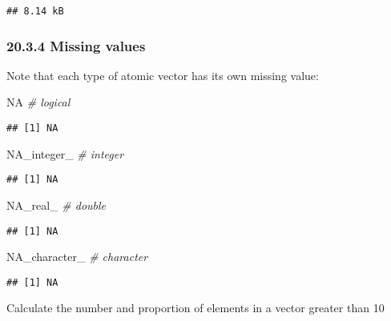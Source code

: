 \documentclass[
]{article}
\newenvironment{Shaded}{\begin{snugshade}}{\end{snugshade}}
\newcommand{\CommentTok}[1]{\textcolor[rgb]{0.56,0.35,0.01}{\textit{#1}}}
\newcommand{\ConstantTok}[1]{\textcolor[rgb]{0.56,0.35,0.01}{#1}}
\begin{document}
\begin{verbatim}
## 8.14 kB
\end{verbatim}

\hypertarget{missing-values-1}{%
\subsubsection{20.3.4 Missing values}\label{missing-values-1}}

Note that each type of atomic vector has its own missing value:

\begin{Shaded}
\begin{Highlighting}[]
\ConstantTok{NA}            \CommentTok{\# logical}
\end{Highlighting}
\end{Shaded}

\begin{verbatim}
## [1] NA
\end{verbatim}

\begin{Shaded}
\begin{Highlighting}[]
\ConstantTok{NA\_integer\_}   \CommentTok{\# integer}
\end{Highlighting}
\end{Shaded}

\begin{verbatim}
## [1] NA
\end{verbatim}

\begin{Shaded}
\begin{Highlighting}[]
\ConstantTok{NA\_real\_}      \CommentTok{\# double}
\end{Highlighting}
\end{Shaded}

\begin{verbatim}
## [1] NA
\end{verbatim}

\begin{Shaded}
\begin{Highlighting}[]
\ConstantTok{NA\_character\_} \CommentTok{\# character}
\end{Highlighting}
\end{Shaded}

\begin{verbatim}
## [1] NA
\end{verbatim}

Calculate the number and proportion of elements in a vector greater than
10
\end{document}
